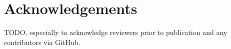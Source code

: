 % 
% 

\chapter*{Acknowledgements}

TODO, especially to acknowledge reviewers prior to publication and any contributors via GitHub.


\newpage
\thispagestyle{empty}
